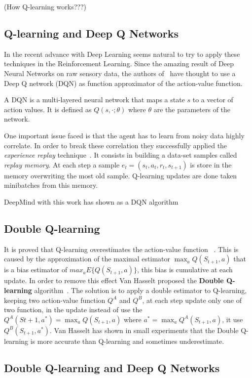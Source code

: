 (How Q-learning works???)

\subsection{Q-learning and Deep Q Networks}

In the recent advance with Deep Learning seems natural to try to apply these techniques in the Reinforcement Learning. Since the amazing result of Deep Neural Networks on raw sensory data, the authors of~\cite{DBLP:journals/corr/MnihKSGAWR13} have thought to use a Deep Q network (DQN) as function approximator of the action-value function.

A DQN is a multi-layered neural network that maps a state $s$ to a vector of action values. It is defined as $Q(s, \cdotp; \theta)$ where $\theta$ are the parameters of the network. 

One important issue faced is that the agent has to learn from noisy data highly correlate. In order to break these correlation they successfully applied the \textit{experience replay} technique~\cite{Lin:1992:RLR:168871}. It consists in building a data-set samples called \textit{replay memory}. At each step a sample $e_t = (s_t, a_t, r_t, s_{t+1})$ is store in the memory overwriting the most old sample. Q-learning updates are done taken minibatches from this memory.

DeepMind with this work has shown as a DQN algorithm 


\subsection{Double Q-learning}

It is proved that Q-learning overestimates the action-value function 
~\cite{NIPS2010_3964}. This is caused by the approximation of the maximal estimator $\max_a Q(S_{t+1}, a)$ that is a bias estimator of $max_a E \{ Q(S_{t+1}, a) \}$, this bias is cumulative at each update. In order to remove this effect Van Hasselt proposed the \textbf{Double Q-learning} algorithm~\cite{NIPS2010_3964}. 
The solution is to apply a double estimator to Q-learning, keeping two action-value function $Q^A$ and $Q^B$, at each step update only one of two function, in the update instead of use the $Q^A(S{t+1}, a^*) = \max_a Q(S_{t+1}, a)$ where $a^* = \max_a Q^A(S_{t+1}, a)$, it use $Q^B(S_{t+1}, a^*)$.
Van Hasselt has shown in small experiments that the Double Q-learning is more accurate than Q-learning and sometimes underestimate.

\subsection{Double Q-learning and Deep Q Networks}

